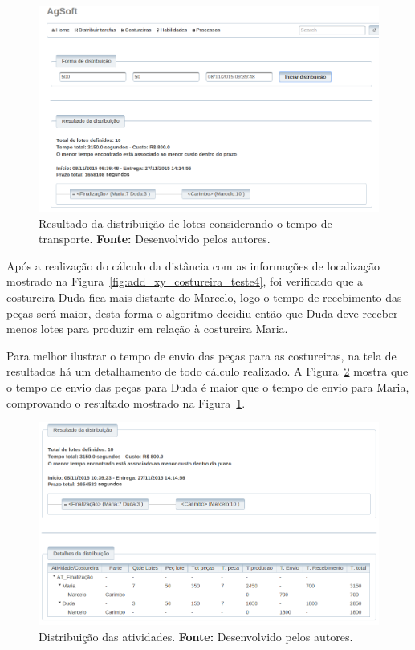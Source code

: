 \newpage

\begin{figure}[h!]
	\centerline{\includegraphics[width=14.7cm]{./imagens/resultado_transporte_teste4.png}}
	\caption[Resultado da distribuição de lotes considerando o tempo de transporte.]
	{Resultado da distribuição de lotes considerando o tempo de transporte. \textbf{Fonte:} Desenvolvido pelos
	autores.}
	\label{fig:resultado_transporte_teste4}
\end{figure}

\par Após a realização do cálculo da distância com as informações de localização mostrado na Figura~\ref{fig:add_xy_costureira_teste4}, 
foi verificado que a costureira Duda fica mais distante do Marcelo, logo o tempo de recebimento das peças será maior, desta forma o 
algoritmo decidiu então que Duda deve receber menos lotes para produzir em relação à costureira Maria.

\par Para melhor ilustrar o tempo de envio das peças para as costureiras, na tela
de resultados há um detalhamento de todo cálculo realizado. A
Figura~\ref{fig:detalhameneto_transporte_teste4} mostra que o tempo de envio das peças para Duda é 
maior que o tempo de envio para Maria, comprovando o resultado mostrado na
Figura~\ref{fig:resultado_transporte_teste4}.

\begin{figure}[h!]
	\centerline{\includegraphics[width=13cm]{./imagens/detalhamento_transporte_teste4.png}}
	\caption[Distribuição das atividades.] 
	{Distribuição das atividades. \textbf{Fonte:} Desenvolvido pelos autores.}
	\label{fig:detalhameneto_transporte_teste4}
\end{figure}

